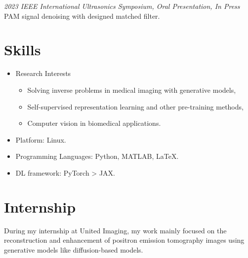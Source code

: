 \documentclass{resume}
\begin{document}
\textit{2023 IEEE International Ultrasonics Symposium, Oral Presentation, In Press}
PAM signal denoising with designed matched filter.


\section{Skills}
\begin{itemize}
    \item Research Interests
    \begin{itemize}
        \item Solving inverse problems in medical imaging with generative models,
        \item Self-supervised representation learning and other pre-training methods,
        \item Computer vision in biomedical applications.
    \end{itemize}
    \item Platform: Linux.
    \item Programming Languages: Python, MATLAB, \LaTeX{}.
    \item DL framework: PyTorch > JAX.
\end{itemize}

\section{Internship}
During my internship at United Imaging, my work mainly focused on the reconstruction and enhancement of positron emission tomography images using generative models like diffusion-based models.
\end{document}
